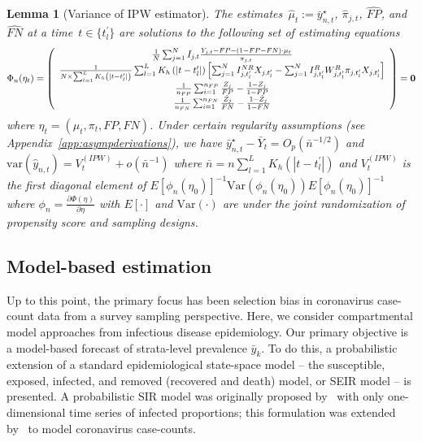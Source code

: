 \documentclass[11pt]{amsart}
\numberwithin{equation}{section}
\theoremstyle{plain}
\newtheorem{lemma}[theorem]{Lemma}
\begin{document}
 \begin{lemma}[Variance of IPW estimator] \normalfont
 \label{lemma:ipw}
The estimates~$\hat \mu_t := \bar y_{n,t}^\star$, $\hat \pi_{j,t}$, $\hat{FP}$, and $\hat{FN}$ at a time~$t \in \{t_l^\prime\}$ are solutions to the following set of estimating equations
 $$
 \Phi_n (\eta_t) =
 \left (
 \begin{array}{c}
 \frac{1}{N} \sum_{j=1}^N I_{j,t} \frac{Y_{j,t} - FP - (1-FP-FN) \cdot \mu_t}{\pi_{j,t}} \\
 \frac{1}{N \times \sum_{l = 1}^L K_h \left(|t - t_l^\prime| \right)} \sum_{l = 1}^L K_h \left(|t - t_l^\prime| \right) \left[ \sum_{j=1}^N I^{NR}_{j,t_l^\prime} X_{j,t_l^\prime} - \sum_{j = 1}^N I^{R}_{j,t_l^\prime} W^{R}_{j,t_l^\prime}  \pi_{j,t_l^\prime} X_{j,t_l^\prime}  \right] \\
 \frac{1}{n_{FP}} \sum_{i=1}^{n_{FP}} \frac{Z_j}{FP} - \frac{1-Z_j}{1-FP} \\
 \frac{1}{n_{FN}} \sum_{i=1}^{n_{FN}} \frac{\tilde Z_j}{FN} - \frac{1-\tilde Z_j}{1-FN} \\
 \end{array}
 \right ) = {\bf 0}
 $$
 where $\eta_t = (\mu_t, \pi_t, FP, FN)$. Under certain regularity assumptions (see Appendix~\ref{app:asympderivations}), we have $\bar y_{n,t}^\star - \bar Y_{t} = O_p (\bar n^{-1/2})$  and $\text{var} (\hat y_{n,t}) = V_{t}^{(IPW)} + o (\bar n^{-1})$ where $\bar n = n \sum_{l=1}^L K_{h} (|t - t_l^\prime|)$ and $V_t^{(IPW)}$ is the first diagonal element of $E [\phi_n(\eta_0)]^{-1} \text{Var}(\phi_n(\eta_0))E [\phi_n(\eta_0)]^{-1}$ where $\phi_n = \frac{\partial \Phi (\eta)}{\partial \eta}$ with $E[\cdot]$ and $\text{Var} (\cdot)$ are under the joint randomization of propensity score and sampling designs.
 \end{lemma}

 \subsection{Model-based estimation}
 \label{section:modelbased}

 Up to this point, the primary focus has been selection bias in coronavirus case-count data from a survey sampling perspective.  Here, we consider compartmental model approaches from infectious disease epidemiology.  Our primary objective is a model-based forecast of strata-level prevalence $\bar y_k$. To do this, a probabilistic extension of a standard epidemiological state-space model -- the susceptible, exposed, infected, and removed (recovered and death) model, or SEIR model -- is presented. A probabilistic SIR model was originally proposed by~\cite{Osthus2017} with only one-dimensional time series of infected proportions; this formulation was extended by~\cite{Song2020} to model coronavirus case-counts.
\end{document}

